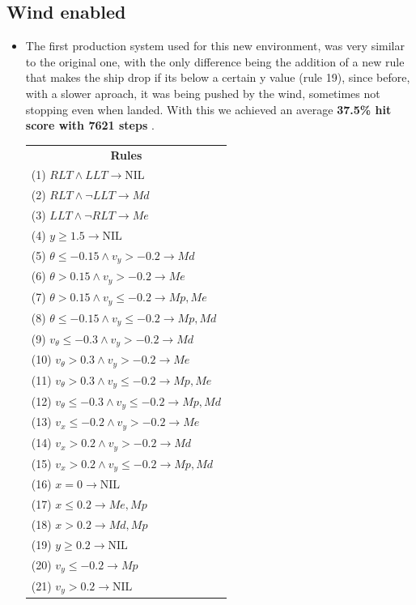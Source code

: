 \documentclass[a4paper, 12pt, fleqn]{report}
\begin{document}
\subsection*{Wind enabled}
\begin{itemize}
    \item The first production system used for this new environment, was very similar to the original one, with the only difference being the addition of a new rule that makes the ship drop if its below a certain y value (rule 19),
    since before, with a slower aproach, it was being pushed by the wind, sometimes not stopping even when landed. With this we achieved an average \textbf{37.5\% hit score with 7621 steps} .

    \begin{table}[h!]
        \begin{tabular}{p{16cm}} 
        \multicolumn{1}{c}{\textbf{Rules}} \\     
        (1) $RLT \land LLT \rightarrow \text{NIL}$ \\  
        (2) $RLT \land \neg LLT \rightarrow Md$ \\  
        (3) $LLT \land \neg RLT \rightarrow Me$ \\  
        (4) $y \ge 1.5 \rightarrow \text{NIL}$ \\  
        (5) $\theta \leq -0.15 \land v_y > -0.2 \rightarrow Md$ \\  
        (6) $\theta > 0.15 \land v_y > -0.2 \rightarrow Me$ \\  
        (7) $\theta > 0.15 \land v_y \leq -0.2 \rightarrow Mp, Me$ \\  
        (8) $\theta \leq -0.15 \land v_y \leq -0.2 \rightarrow Mp, Md$ \\  
        (9) $v_\theta \leq -0.3 \land v_y > -0.2 \rightarrow Md$ \\  
        (10) $v_\theta > 0.3 \land v_y > -0.2 \rightarrow Me$ \\  
        (11) $v_\theta > 0.3 \land v_y \leq -0.2 \rightarrow Mp, Me$ \\  
        (12) $v_\theta \leq -0.3 \land v_y \leq -0.2 \rightarrow Mp, Md$ \\  
        (13) $v_x \leq -0.2 \land v_y > -0.2 \rightarrow Me$ \\  
        (14) $v_x > 0.2 \land v_y > -0.2 \rightarrow Md$ \\  
        (15) $v_x > 0.2 \land v_y \leq -0.2 \rightarrow Mp, Md$ \\  
        (16) $x = 0 \rightarrow \text{NIL}$ \\  
        (17) $x \leq 0.2 \rightarrow Me, Mp$ \\  
        (18) $x > 0.2 \rightarrow Md, Mp$ \\  
        (19) $y \geq  0.2 \rightarrow \text{NIL}$ \\
        (20) $v_y \leq -0.2 \rightarrow Mp$ \\  
        (21) $v_y > 0.2 \rightarrow \text{NIL}$ \\  
        

\end{tabular}
\end{table}
\end{itemize}
\end{document}
